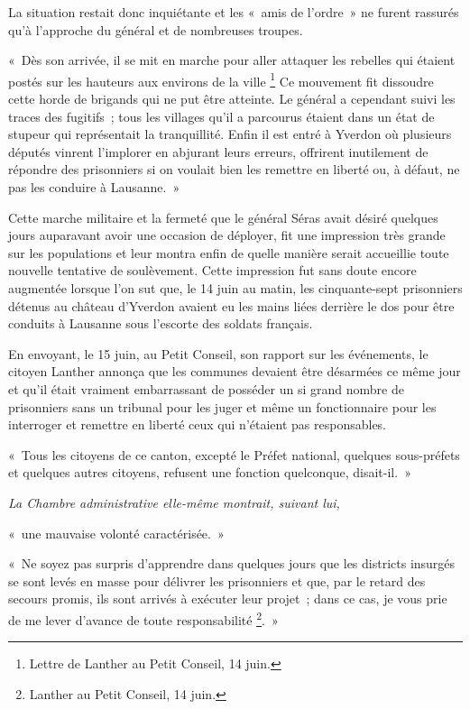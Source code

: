 \documentclass[french,twoside]{book} %
\newenvironment{quoteblock}%
  {\begin{quoting}}
  {\end{quoting}}
\newenvironment{quotebar}{%
    \def\FrameCommand{{\color{rubric!10!}\vrule width 0.5em} \hspace{0.9em}}%
    \def\OuterFrameSep{\itemsep} %
    \MakeFramed {\advance\hsize-\width \FrameRestore}
  }%
  {%
    \endMakeFramed
  }
\renewenvironment{quoteblock}%
  {%
    \savenotes
    \setstretch{0.9}
    \normalfont
    \begin{quotebar}
  }
  {%
    \end{quotebar}
    \spewnotes
  }
\begin{document}
\noindent La situation restait donc inquiétante et les « amis de l’ordre » ne furent rassurés qu’à l’approche du général et de nombreuses troupes.\par

\begin{quoteblock}
 \noindent « Dès son arrivée, il se mit en marche pour aller attaquer les rebelles qui étaient postés sur les hauteurs aux environs de la ville \footnote{Lettre de Lanther au Petit Conseil, 14 juin.} Ce mouvement fit dissoudre cette horde de brigands qui ne put être atteinte. Le général a cependant suivi les traces des fugitifs ; tous les villages qu’il a parcourus étaient dans un état de stupeur qui représentait la tranquillité. Enfin il est entré à Yverdon où plusieurs députés vinrent l’implorer en abjurant leurs erreurs, offrirent inutilement de répondre des prisonniers si on voulait bien les remettre en liberté ou, à défaut, ne pas les conduire à Lausanne. »
 \end{quoteblock}

\noindent Cette marche militaire et la fermeté que le général Séras avait désiré quelques jours auparavant avoir une occasion de déployer, fit une impression très grande sur les populations et leur montra enfin de quelle manière serait accueillie toute nouvelle tentative de soulèvement. Cette impression fut sans doute encore augmentée lorsque l’on sut que, le 14 juin au matin, les cinquante-sept prisonniers détenus au château d’Yverdon avaient eu les mains liées derrière le dos pour être conduits à Lausanne sous l’escorte des soldats français.\par
En envoyant, le 15 juin, au Petit Conseil, son rapport sur les événements, le citoyen Lanther annonça que les communes devaient être désarmées ce même jour et qu’il était vraiment embarrassant de posséder un si grand nombre de prisonniers sans un tribunal pour les juger et même un fonctionnaire pour les interroger et remettre en liberté ceux qui n’étaient pas responsables.\par

\begin{quoteblock}
 \noindent « Tous les citoyens de ce canton, excepté le Préfet national, quelques sous-préfets et quelques autres citoyens, refusent une fonction quelconque, disait-il. »\par
 {\itshape La Chambre administrative elle-même montrait, suivant lui,}\par
 « une mauvaise volonté caractérisée. »\par
 « Ne soyez pas surpris d’apprendre dans quelques jours que les districts insurgés se sont levés en masse pour délivrer les prisonniers et que, par le retard des secours promis, ils sont arrivés à exécuter leur projet ; dans ce cas, je vous prie de me lever d’avance de toute responsabilité \footnote{Lanther au Petit Conseil, 14 juin.}. »
 \end{quoteblock}
\end{document}
